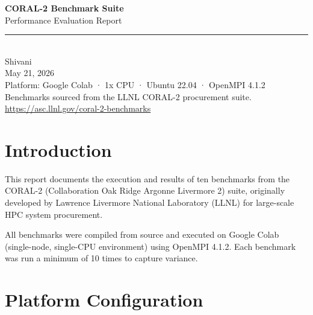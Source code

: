 \documentclass[12pt,a4paper]{article}
\begin{document}
\begin{titlepage}
  \centering
  \vspace*{2cm}
  {\Huge\bfseries\color{llnlblue} CORAL-2 Benchmark Suite\\[0.5em]}
  {\Large\color{gray} Performance Evaluation Report}\\[1.5em]
  \rule{0.6\textwidth}{0.4pt}\\[1em]
  {\large Shivani}\\[0.3em]
  {\normalsize May 21, 2026}\\[0.5em]
  {\small Platform: Google Colab · 1x CPU · Ubuntu 22.04 · OpenMPI 4.1.2}
  \vfill
  {\small Benchmarks sourced from the LLNL CORAL-2 procurement suite.\\
  \url{https://asc.llnl.gov/coral-2-benchmarks}}
\end{titlepage}

\tableofcontents
\newpage

\section{Introduction}

This report documents the execution and results of ten benchmarks from the CORAL-2 (Collaboration Oak Ridge Argonne Livermore 2) suite, originally developed by Lawrence Livermore National Laboratory (LLNL) for large-scale HPC system procurement.

All benchmarks were compiled from source and executed on Google Colab (single-node, single-CPU environment) using OpenMPI 4.1.2. Each benchmark was run a minimum of 10 times to capture variance.

\section{Platform Configuration}
\end{document}
